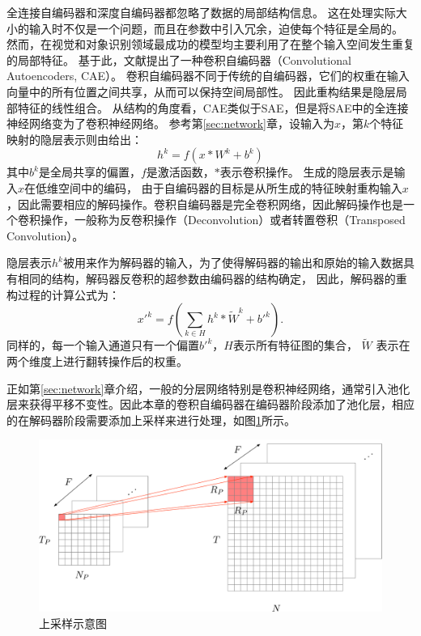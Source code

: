 全连接自编码器和深度自编码器都忽略了数据的局部结构信息。
这在处理实际大小的输入时不仅是一个问题，而且在参数中引入冗余，迫使每个特征是全局的。
然而，在视觉和对象识别领域最成功的模型均主要利用了在整个输入空间发生重复的局部特征。
基于此，文献\cite{masci2011stacked}提出了一种卷积自编码器（Convolutional Autoencoders, CAE）。
卷积自编码器不同于传统的自编码器，它们的权重在输入向量中的所有位置之间共享，从而可以保持空间局部性。
因此重构结果是隐层局部特征的线性组合。
从结构的角度看，CAE类似于SAE，但是将SAE中的全连接神经网络变为了卷积神经网络。
参考第\ref{sec:network}章，设输入为$x$，第$k$个特征映射的隐层表示则由给出：
\begin{equation}
	h^k=f(x*W^k+b^k)
	\label{equ:cae1}
\end{equation}
其中$b^k$是全局共享的偏置，$f$是激活函数，$*$表示卷积操作。
生成的隐层表示是输入$x$在低维空间中的编码，
由于自编码器的目标是从所生成的特征映射重构输入$x$，因此需要相应的解码操作。卷积自编码器是完全卷积网络，因此解码操作也是一个卷积操作，一般称为反卷积操作（Deconvolution）或者转置卷积（Transposed Convolution）。

隐层表示$h^k$被用来作为解码器的输入，为了使得解码器的输出和原始的输入数据具有相同的结构，解码器反卷积的超参数由编码器的结构确定，
因此，解码器的重构过程的计算公式为：
\begin{equation}
	x'^k=f(\sum_{k \in H}h^k * \tilde{W}^k + b'^k).
	\label{equ:cae2}
\end{equation}
同样的，每一个输入通道只有一个偏置$b'^k$，$H$表示所有特征图的集合，
$\tilde{W}$ 表示在两个维度上进行翻转操作后的权重。

正如第\ref{sec:network}章介绍，一般的分层网络特别是卷积神经网络，通常引入池化层来获得平移不变性。因此本章的卷积自编码器在编码器阶段添加了池化层，相应的在解码器阶段需要添加上采样来进行处理，如图\ref{fig:unpool}所示。
\begin{figure}[hbt]
	\centering
	\includegraphics[width=13.5cm]{figures/AE/unpool}
	\caption{上采样示意图}
	\label{fig:unpool}
\end{figure}

